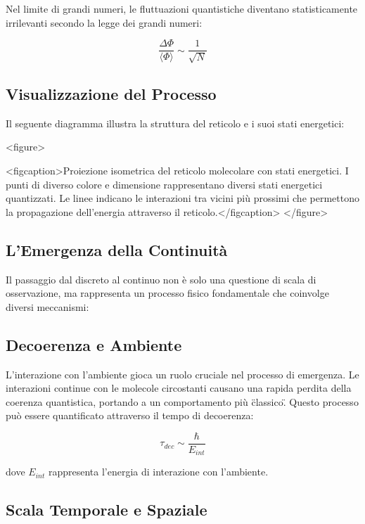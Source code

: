 \documentclass[a4paper,11pt]{article}
\begin{document}
Nel limite di grandi numeri, le fluttuazioni quantistiche diventano
statisticamente irrilevanti secondo la legge dei grandi numeri:

\begin{equation}
\frac{\Delta \Phi}{\langle \Phi \rangle} \sim \frac{1}{\sqrt{N}}
\end{equation}


\subsection{Visualizzazione del Processo}

Il seguente diagramma illustra la struttura del reticolo e i suoi stati
energetici:

<figure>

<figcaption>Proiezione isometrica del reticolo molecolare con stati
energetici. I punti di diverso colore e dimensione rappresentano diversi
stati energetici quantizzati. Le linee indicano le interazioni tra
vicini più prossimi che permettono la propagazione dell’energia
attraverso il reticolo.</figcaption>
</figure>

\subsection{L'Emergenza della Continuità}

Il passaggio dal discreto al continuo non è solo una questione di scala
di osservazione, ma rappresenta un processo fisico fondamentale che
coinvolge diversi meccanismi:

\subsection{Decoerenza e Ambiente}

L'interazione con l'ambiente gioca un ruolo cruciale nel processo di
emergenza. Le interazioni continue con le molecole circostanti causano
una rapida perdita della coerenza quantistica, portando a un
comportamento più \"classico\". Questo processo può essere quantificato
attraverso il tempo di decoerenza:

\begin{equation}
\tau_{dec} \sim \frac{\hbar}{E_{int}}
\end{equation}


dove $E_{int}$ rappresenta l'energia di interazione con l'ambiente.

\subsection{Scala Temporale e Spaziale}
\end{document}
